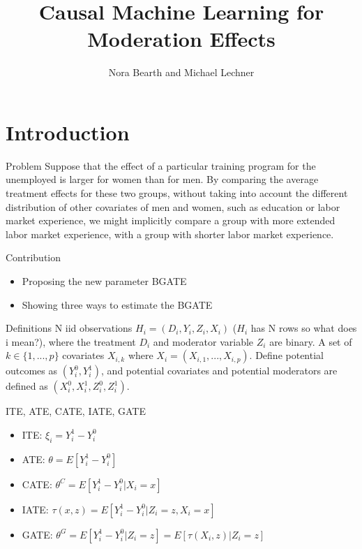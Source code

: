 \documentclass{beamer}\usepackage{listings}
\institute{University of Copenhagen}
\subtitle{Nora Bearth and Michael Lechner}
\date{}
\title{Causal Machine Learning for Moderation Effects}
\begin{document}
\maketitle
\section{Introduction}
\label{sec:org48cdcd3}

\begin{frame}[label={sec:org10fe149}]{Problem}
Suppose that the effect of a particular training program for the unemployed is larger for women than for men. By comparing the average treatment effects for these two groups, without taking into account the different distribution of other covariates of men and women, such as education or labor market experience, we might implicitly compare a group with more extended labor market experience, with a group with shorter labor market experience.
\end{frame}

\begin{frame}[label={sec:orgea1864a}]{Contribution}
\begin{itemize}
\item Proposing the new parameter BGATE
\item Showing three ways to estimate the BGATE
\end{itemize}
\end{frame}


\begin{frame}[label={sec:org83b04fc}]{Definitions}
N iid observations \(H_i = (D_i,Y_i,Z_i,X_i)\) (\(H_i\) has N rows so what does i mean?), where the treatment \(D_i\) and moderator variable \(Z_i\) are binary. A set of \(k\in\{1,...,p\}\) covariates \(X_{i,k}\) where \(X_i = (X_{i,1},...,X_{i,p})\). Define potential outcomes as \((Y^0_i,Y^1_i)\), and potential covariates and potential moderators are defined as \((X^0_i,X^1_i,Z^0_i,Z^1_i)\).
\end{frame}

\begin{frame}[label={sec:org1807721}]{ITE, ATE, CATE, IATE, GATE}
\begin{itemize}
\item ITE: \(\xi_i = Y^1_i-Y^0_i\)
\item ATE: \(\theta = E[Y^1_i-Y^0_i]\)
\item CATE: \(\theta^C = E[Y^1_i-Y^0_i\vert X_i = x]\)
\item IATE: \(\tau(x,z) = E[Y^1_i-Y^0_i\vert Z_i = z,X_i = x]\)
\item GATE: \(\theta^G = E[Y^1_i-Y^0_i\vert Z_i = z] = E[\tau(X_i,z)\vert Z_i = z]\)
\end{itemize}
\end{frame}
\end{document}
